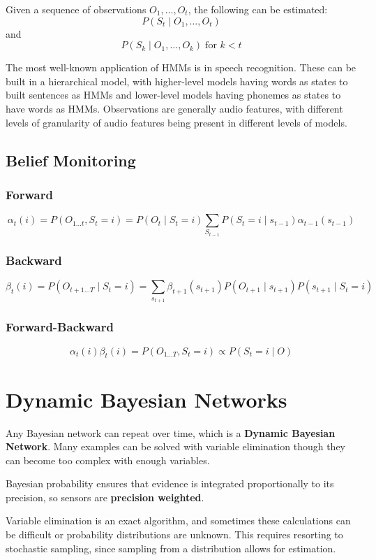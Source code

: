 \documentclass[11pt]{article}
\begin{document}
Given a sequence of observations \(O_{1}, \dots, O_{t}\), the following
can be estimated:
$$ P(S_{t} \mid O_{1}, \dots, O_{t}) $$
and
$$ P(S_{k} \mid O_{1}, \dots, O_{k}) \; \text{for $k < t$} $$

The most well-known application of HMMs is in speech recognition.
These can be built in a hierarchical model, with higher-level models
having words as states to built sentences as HMMs and lower-level
models having phonemes as states to have words as HMMs.
Observations are generally audio features, with different
levels of granularity of audio features being present in different
levels of models.
\subsection{Belief Monitoring}
\label{sec:org327feb1}
\subsubsection{Forward}
\label{sec:orgaefdfe1}
$$ \alpha_{t} (i) = P(O_{1 \dots t}, S_{t} = i) = P(O_{t} \mid S_{t} = i) \sum_{S_{t-1}} P(S_{t} = i \mid s_{t-1}) \alpha_{t-1}(s_{t-1}) $$
\subsubsection{Backward}
\label{sec:orgb9a8482}
$$ \beta_{t}(i) = P(O_{t+1 \dots T} \mid S_{t} = i) = \sum_{s_{t+1}} \beta_{t+1} (s_{t+1}) P(O_{t+1} \mid s_{t+1}) P(s_{t+1} \mid S_{t} = i) $$
\subsubsection{Forward-Backward}
\label{sec:org467dcf4}
$$ \alpha_{t}(i) \beta_{t}(i) = P(O_{1 \dots T}, S_{t} = i) \propto P(S_{t} = i \mid O) $$
\section{Dynamic Bayesian Networks}
\label{sec:org451e7f7}
Any Bayesian network can repeat over time, which is a \textbf{Dynamic Bayesian Network}.
Many examples can be solved with variable elimination though they can become too complex with
enough variables.

Bayesian probability ensures that evidence is integrated proportionally to its precision,
so sensors are \textbf{precision weighted}.

Variable elimination is an exact algorithm, and sometimes these calculations can be difficult
or probability distributions are unknown.
This requires resorting to stochastic sampling, since sampling from a distribution allows
for estimation.
\end{document}
